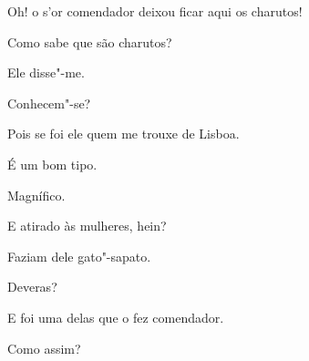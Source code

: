   Oh! o
s'or comendador deixou ficar aqui os charutos!

  Como sabe que são charutos?

  Ele disse"-me.

  Conhecem"-se?

  Pois se foi ele quem me trouxe de Lisboa.

  É um bom tipo.

  Magnífico.

  E atirado às mulheres, hein?

  Faziam dele gato"-sapato.

  Deveras?

  E foi uma delas que o fez comendador.

  Como assim?

